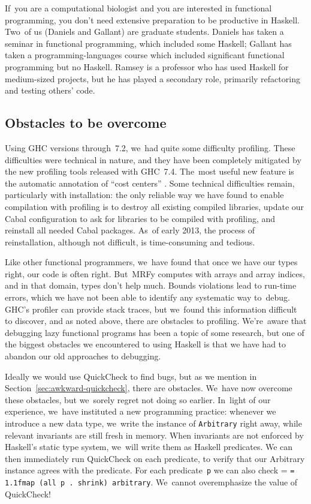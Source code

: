 \documentclass[]{jfp1}
\makeatletter
\newcommand\secref[1]{Section~\ref{sec:#1}}
\newcommand{\mono}[1]{%
  {\@tempdima = \fontdimen2\font
   \texttt{\spaceskip = 1.1\@tempdima #1}}}
\let\cite\citep
\makeatother
\begin{document}
If~you are a computational biologist and you are interested in
functional programming, you don't need extensive preparation
to be productive in Haskell.
Two~of us (Daniels and Gallant) are graduate students.
Daniels has taken a seminar in functional programming, which
included some Haskell;
Gallant has taken a programming-languages course which included
significant functional programming but no Haskell.
Ramsey is a professor who has used Haskell 
for medium-sized projects,
but he has played a secondary role, primarily refactoring and testing
others' code. 


\subsection{Obstacles to be overcome}

Using GHC versions through~7.2, 
we~had quite some difficulty profiling.
These difficulties were technical in nature, and they have been
completely mitigated by the new profiling tools released 
with
GHC~7.4.
The~most useful new feature is the automatic annotation of ``cost
centers'' \cite{sansom-pj}. 
Some technical difficulties remain, particularly with installation:
the only reliable way we have found to enable compilation with
profiling is to destroy all existing compiled libraries, 
update our Cabal configuration to ask for libraries to be compiled
with profiling, and reinstall all needed Cabal packages.
As~of early 2013, the process of reinstallation, although not
difficult, is time-consuming and tedious.

Like other functional programmers, we~have found that 
once we have our types right, our code is often right.
But~MRFy computes with arrays and array indices,
and in that domain, types don't help much.
Bounds violations lead to run-time errors, which we have not been able
to identify any systematic way to~debug.
GHC's profiler can provide stack traces, but we~found this information
difficult to discover, and as noted above,
there are obstacles to profiling.
We're~aware that debugging lazy functional programs has been a topic
of some research,
but one of the biggest obstacles we encountered to using Haskell is
that we have had to abandon our old approaches to debugging.

Ideally we would use QuickCheck to find bugs, but as we mention in
\secref{awkward-quickcheck}, there are obstacles.
We~have now overcome these obstacles, but
we~sorely regret not doing so earlier.
In~light of our experience, we~have instituted a new programming practice:
whenever we introduce a new data type,
we~write the instance of
\texttt{Arbitrary} right away, while
relevant invariants are still fresh in memory.
When invariants are not enforced by Haskell's static type system,
we~will write them as Haskell predicates.
We can then immediately run QuickCheck on each predicate, to verify
that our Arbitrary instance agrees with the predicate.
For each predicate~\texttt{p} we can also check
\mono{fmap (all p . shrink) arbitrary}.
We~cannot overemphasize the value of QuickCheck!
\end{document}
